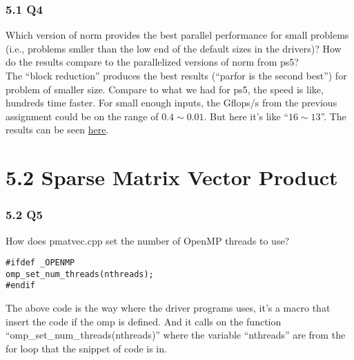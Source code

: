 \documentclass[]{article}
\begin{document}
    \subsubsection*{5.1 Q4}
        Which version of norm provides the best parallel performance for small problems (i.e., problems smller than the low end of the default sizes in the drivers)? How do the results compare to the parallelized versions of norm from ps5?
        \\[1.1em]
        The ``block reduction'' produces the best results (``parfor is the second best'') for problem of smaller size. Compare to what we had for ps5, the speed is like, hundreds time faster. For small enough inputs, the Gflops/s from the previous assignment could be on the range of $0.4 \sim 0.01$. But here it's like ``$16\sim 13$''. The results can be seen \hyperref[5.2.appendix]{here}. 
        
\section*{5.2 Sparse Matrix Vector Product}
    \subsubsection*{5.2 Q5}
    How does pmatvec.cpp set the number of OpenMP threads to use?
    \\[1.1em]
    \begin{lstlisting}
#ifdef _OPENMP
omp_set_num_threads(nthreads);
#endif
    \end{lstlisting}
    The above code is the way where the driver programs uses, it's a macro that insert the code if the omp is defined. And it calls on the function ``omp\_set\_num\_threads(nthreads)'' where the variable ``nthreads'' are from the for loop that the snippet of code is in.
\end{document}
